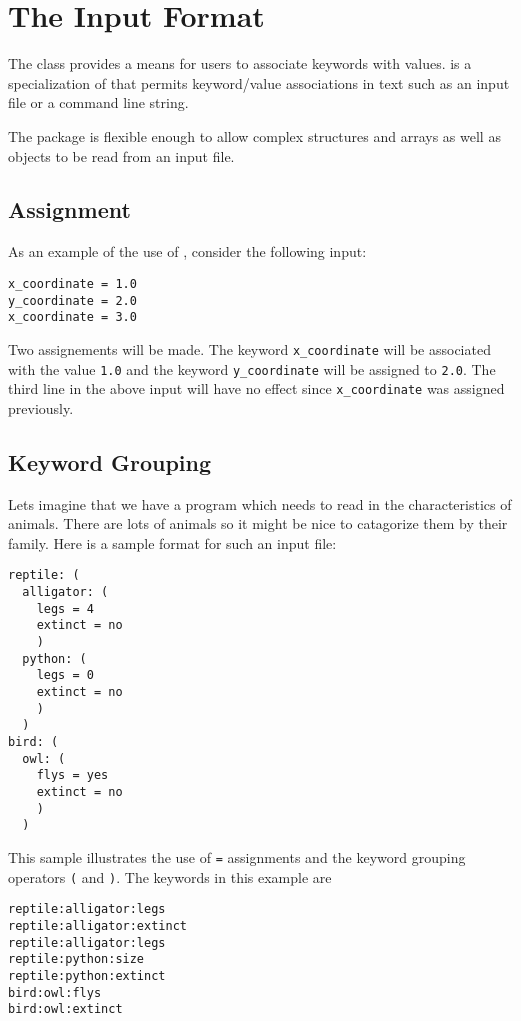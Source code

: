 
\section{The  Input Format}
\label{ParsedKeyVal}
\label{KeyVal}

The  class provides a means for users to associate keywords
with values.   is a specialization of 
that permits keyword/value associations in text such as an input file or a
command line string.

The package is flexible enough to allow complex structures and arrays as
well as objects to be read from an input file.

\subsection{Assignment}

As an example of the use of , consider the following
input:
\begin{verbatim}
x_coordinate = 1.0
y_coordinate = 2.0
x_coordinate = 3.0
\end{verbatim}
Two assignements will be made.  The keyword \verb|x_coordinate| will be
associated with the value \verb|1.0| and the keyword \verb|y_coordinate|
will be assigned to \verb|2.0|.  The third line in the above input
will have no effect since \verb|x_coordinate| was assigned previously.

\subsection{Keyword Grouping}

Lets imagine that we have a program which needs to read in the
characteristics of animals.  There are lots of animals so it might be
nice to catagorize them by their family.  Here is a sample format for
such an input file:
\begin{verbatim}
reptile: (
  alligator: (
    legs = 4
    extinct = no
    )
  python: (
    legs = 0
    extinct = no
    )
  )
bird: (
  owl: (
    flys = yes
    extinct = no
    )
  )
\end{verbatim}

This sample illustrates the use of  \verb|=| 
assignments and the keyword grouping operators \verb|(| and \verb|)|.
The keywords in this example are
\begin{verbatim}
reptile:alligator:legs
reptile:alligator:extinct
reptile:alligator:legs
reptile:python:size
reptile:python:extinct
bird:owl:flys
bird:owl:extinct
\end{verbatim}

